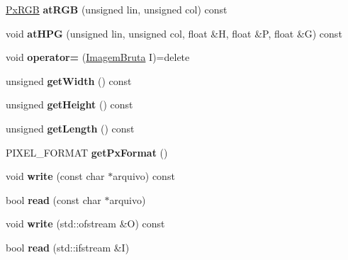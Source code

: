 \begin{DoxyCompactItemize}
\item 
\hyperlink{classPxRGB}{Px\+R\+GB} {\bfseries at\+R\+GB} (unsigned lin, unsigned col) const \hypertarget{classImagemBruta_a2283a1b9d849242ea5cc60cc4c4cf8cf}{}\label{classImagemBruta_a2283a1b9d849242ea5cc60cc4c4cf8cf}

\item 
void {\bfseries at\+H\+PG} (unsigned lin, unsigned col, float \&H, float \&P, float \&G) const \hypertarget{classImagemBruta_ac4c4ee8cda55544e943c9af38c20fddb}{}\label{classImagemBruta_ac4c4ee8cda55544e943c9af38c20fddb}

\item 
void {\bfseries operator=} (\hyperlink{classImagemBruta}{Imagem\+Bruta} I)=delete\hypertarget{classImagemBruta_a06533a52ae4bd57c9bf24218ab702e52}{}\label{classImagemBruta_a06533a52ae4bd57c9bf24218ab702e52}

\item 
unsigned {\bfseries get\+Width} () const \hypertarget{classImagemBruta_a26be6b7083ab5303cb9b797b25a9d796}{}\label{classImagemBruta_a26be6b7083ab5303cb9b797b25a9d796}

\item 
unsigned {\bfseries get\+Height} () const \hypertarget{classImagemBruta_a40a1553f0ea56fa23f78e3592dc926c0}{}\label{classImagemBruta_a40a1553f0ea56fa23f78e3592dc926c0}

\item 
unsigned {\bfseries get\+Length} () const \hypertarget{classImagemBruta_af67f56676acdd10c062b662970aa5d46}{}\label{classImagemBruta_af67f56676acdd10c062b662970aa5d46}

\item 
P\+I\+X\+E\+L\+\_\+\+F\+O\+R\+M\+AT {\bfseries get\+Px\+Format} ()\hypertarget{classImagemBruta_af89d9f4d963e11164898c77d4aad51af}{}\label{classImagemBruta_af89d9f4d963e11164898c77d4aad51af}

\item 
void {\bfseries write} (const char $\ast$arquivo) const \hypertarget{classImagemBruta_aaef6ca2a4ada9e738133ae7f20200542}{}\label{classImagemBruta_aaef6ca2a4ada9e738133ae7f20200542}

\item 
bool {\bfseries read} (const char $\ast$arquivo)\hypertarget{classImagemBruta_a2a68c9c4f5b12446107c09735d1c5874}{}\label{classImagemBruta_a2a68c9c4f5b12446107c09735d1c5874}

\item 
void {\bfseries write} (std\+::ofstream \&O) const \hypertarget{classImagemBruta_a649a8af49f180c28b5c125e992267dc8}{}\label{classImagemBruta_a649a8af49f180c28b5c125e992267dc8}

\item 
bool {\bfseries read} (std\+::ifstream \&I)\hypertarget{classImagemBruta_aa4bffdbe83f135877d8baab28e1cb589}{}\label{classImagemBruta_aa4bffdbe83f135877d8baab28e1cb589}

\end{DoxyCompactItemize}
